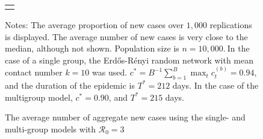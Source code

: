 \documentclass[12pt]{article}
\begin{document}
\begin{figure}[tbh]%
\caption
{The average number of aggregate new cases using the single- and multi-group models with ${\mathcal
{R}_0}=3$}%
\vspace{-0.3cm}%
\label{fig: compare_multi_agg}

\begin{center}%
\begin{tabular}
[c]{c}%
{\includegraphics[
height=1.9951in,
width=2.6524in
]%
{figs/theory_cmp_single_multigroup_dcT.png}%
}
\end{tabular}



\end{center}

%

\vspace{-0.3cm}%
\footnotesize
{}Notes: The average proportion of new cases over $1,000$ replications is
displayed. The average number of new cases is very close to the median,
although not shown. Population size is $n=10,000$.$\ $In the case of a single
group, the Erd\H{o}s-R\'{e}nyi random network with mean contact number $k=10$
was used. $c^{\ast}=B^{-1}\sum_{b=1}^{B}\max_{t}c_{t}^{(b)}=0.94$, and the
duration of the epidemic is $T^{\ast}=212$ days. In the case of the multigroup
model, $c^{\ast}=0.90$, and $T^{\ast}=215$ days.%

\end{figure}%
\end{document}
